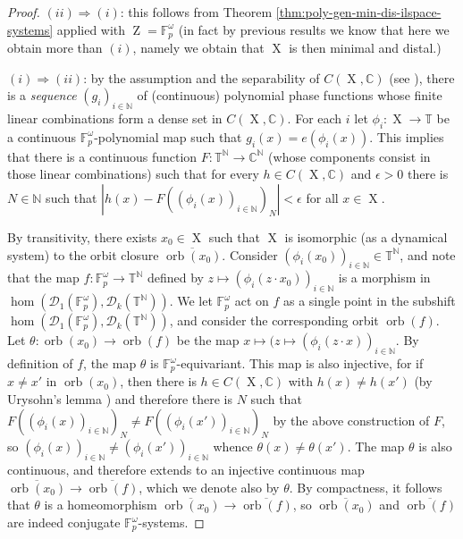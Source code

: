 \documentclass[a4paper,12pt,reqno]{amsart}
\theoremstyle{definition}
\newcommand{\mc}{\mathcal}
\newcommand{\mb}{\mathbb}
\DeclareMathOperator{\ab}{Z}
\DeclareMathOperator{\ns}{X}
\DeclareMathOperator{\orb}{orb}
\begin{document}
\begin{proof}
$(ii)\Rightarrow (i)$: this follows from Theorem \ref{thm:poly-gen-min-dis-ilspace-systems} applied with $\ab=\mb{F}_p^\omega$ (in fact by previous results we know that here we obtain more than $(i)$, namely we obtain that $\ns$ is then minimal and distal.)

$(i)\Rightarrow (ii)$: by the assumption and the separability of $C(\ns,\mb{C})$ (see \cite[Section 12.3 page 251]{Royden-Fitzpatrick}), there is a \emph{sequence} $(g_i)_{i\in \mb{N}}$ of (continuous) polynomial phase functions whose finite linear combinations form a dense set in $C(\ns,\mb{C})$. For each $i$ let $\phi_i:\ns\to \mb{T}$ be a continuous $\mb{F}_p^\omega$-polynomial map such that $g_i(x)=e(\phi_i(x))$. This implies that there is a continuous function $F:\mb{T}^\mb{N}\to \mb{C}^\mb{N}$ (whose components consist in those linear combinations) such that for every $h\in C(\ns,\mb{C})$ and $\epsilon>0$ there is $N\in\mb{N}$ such that $|h(x)-F((\phi_i(x))_{i\in\mb{N}})_N|<\epsilon$ for all $x\in\ns$.

By transitivity, there exists $x_0\in \ns$ such that $\ns$ is isomorphic (as a dynamical system) to the orbit closure $\overline{\orb(x_0)}$.  Consider $(\phi_i(x_0))_{i\in \mb{N}}\in \mb{T}^\mb{N}$, and note that the map $f:\mb{F}_p^\omega\to \mb{T}^\mb{N}$ defined by $z\mapsto (\phi_i(z\cdot x_0))_{i\in \mb{N}}$ is a morphism in $\hom(\mc{D}_1(\mb{F}_p^\omega),\mc{D}_k(\mb{T}^\mb{N}))$. We let $\mb{F}_p^\omega$ act on $f$ as a single point in the subshift $\hom(\mc{D}_1(\mb{F}_p^\omega),\mc{D}_k(\mb{T}^\mb{N}))$, and consider the corresponding orbit $\orb(f)$. Let $\theta:\orb(x_0)\to \orb(f)$ be the map $x\mapsto (z\mapsto (\phi_i(z\cdot x))_{i\in\mb{N}}$. By definition of $f$, the map $\theta$ is $\mb{F}_p^\omega$-equivariant. This map is also injective, for if $x\neq x'$ in $\orb(x_0)$, then there is $h\in C(\ns,\mb{C})$ with $h(x)\neq h(x')$ (by Urysohn's lemma \cite[Theorem 33.1]{Munkres}) and therefore there is $N$ such that $F((\phi_i(x))_{i\in\mb{N}})_N\neq F((\phi_i(x'))_{i\in\mb{N}})_N$ by the above construction of $F$, so $(\phi_i(x))_{i\in\mb{N}}\neq (\phi_i(x'))_{i\in\mb{N}}$ whence $\theta(x)\neq \theta(x')$. The map $\theta$ is also continuous, and therefore extends to an injective continuous map $\overline{\orb(x_0)}\to\overline{\orb(f)}$, which we denote also by $\theta$. By compactness, it follows that $\theta$ is a homeomorphism $\overline{\orb(x_0)}\to\overline{\orb(f)}$, so $\overline{\orb(x_0)}$ and  $\overline{\orb(f)}$ are indeed conjugate $\mb{F}_p^\omega$-systems. 


\end{proof}
\end{document}
